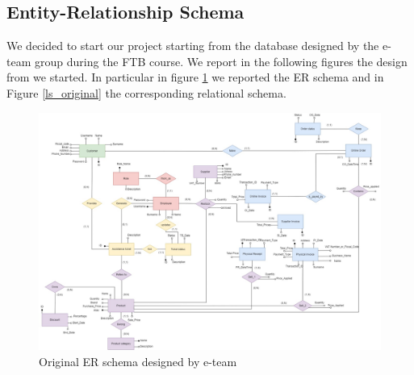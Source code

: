 \subsection{Entity-Relationship Schema}

We decided to start our project starting from the database designed by the e-team group during the FTB course. We report in the following figures the design from we started. In particular in figure \ref{er_original} we reported the ER schema and in Figure \ref{ls_original} the corresponding relational schema.
\begin{figure}[H]
\centering
\includegraphics[width=16.5cm]{Schemas/ER_original.jpg}
\caption{Original ER schema designed by e-team}
\label{er_original}
\end{figure}


